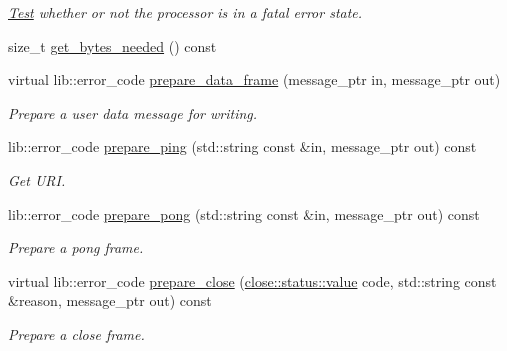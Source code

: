\begin{DoxyCompactItemize}
\begin{DoxyCompactList}\small\item\em \mbox{\hyperlink{struct_test}{Test}} whether or not the processor is in a fatal error state. \end{DoxyCompactList}\item 
size\+\_\+t \mbox{\hyperlink{classwebsocketpp_1_1processor_1_1hybi13_a0e7fbb706a341f7d125c27e7ef001d92}{get\+\_\+bytes\+\_\+needed}} () const
\item 
virtual lib\+::error\+\_\+code \mbox{\hyperlink{classwebsocketpp_1_1processor_1_1hybi13_a72f4833d66eb51e37a956f434895b3ab}{prepare\+\_\+data\+\_\+frame}} (message\+\_\+ptr in, message\+\_\+ptr out)
\begin{DoxyCompactList}\small\item\em Prepare a user data message for writing. \end{DoxyCompactList}\item 
\mbox{\label{classwebsocketpp_1_1processor_1_1hybi13_a38d06bc30c10cd1947c9a7b3051f8961}} 
lib\+::error\+\_\+code \mbox{\hyperlink{classwebsocketpp_1_1processor_1_1hybi13_a38d06bc30c10cd1947c9a7b3051f8961}{prepare\+\_\+ping}} (std\+::string const \&in, message\+\_\+ptr out) const
\begin{DoxyCompactList}\small\item\em Get U\+RI. \end{DoxyCompactList}\item 
lib\+::error\+\_\+code \mbox{\hyperlink{classwebsocketpp_1_1processor_1_1hybi13_ab5ca972653c126e7c6a05c529b394321}{prepare\+\_\+pong}} (std\+::string const \&in, message\+\_\+ptr out) const
\begin{DoxyCompactList}\small\item\em Prepare a pong frame. \end{DoxyCompactList}\item 
virtual lib\+::error\+\_\+code \mbox{\hyperlink{classwebsocketpp_1_1processor_1_1hybi13_a8cbb98af828463c5ef80429a7ade715d}{prepare\+\_\+close}} (\mbox{\hyperlink{namespacewebsocketpp_1_1close_1_1status_a8614a5c4733d708e2d2a32191c5bef84}{close\+::status\+::value}} code, std\+::string const \&reason, message\+\_\+ptr out) const
\begin{DoxyCompactList}\small\item\em Prepare a close frame. \end{DoxyCompactList}\end{DoxyCompactItemize}
